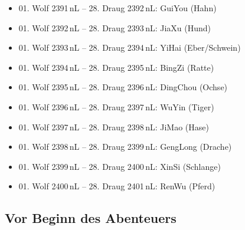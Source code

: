 \documentclass[
a4paper,
twoside,
DIV=calc,
BCOR=4mm,
fontsize=9pt,
twocolumn=on,
titlepage=on,
parskip=half
]{scrartcl}
\begin{document}
\begin{itemize}
\item 01. Wolf 2391\,nL -- 28. Draug 2392\,nL: GuiYou (Hahn)
\item 01. Wolf 2392\,nL -- 28. Draug 2393\,nL: JiaXu (Hund)
\item 01. Wolf 2393\,nL -- 28. Draug 2394\,nL: YiHai (Eber/Schwein)
\item 01. Wolf 2394\,nL -- 28. Draug 2395\,nL: BingZi (Ratte)
\item 01. Wolf 2395\,nL -- 28. Draug 2396\,nL: DingChou (Ochse)
\item 01. Wolf 2396\,nL -- 28. Draug 2397\,nL: WuYin (Tiger)
\item 01. Wolf 2397\,nL -- 28. Draug 2398\,nL: JiMao (Hase)
\item 01. Wolf 2398\,nL -- 28. Draug 2399\,nL: GengLong (Drache)
\item 01. Wolf 2399\,nL -- 28. Draug 2400\,nL: XinSi (Schlange)
\item 01. Wolf 2400\,nL -- 28. Draug 2401\,nL: RenWu (Pferd)
\end{itemize}

\subsection{Vor Beginn des Abenteuers}
\end{document}
